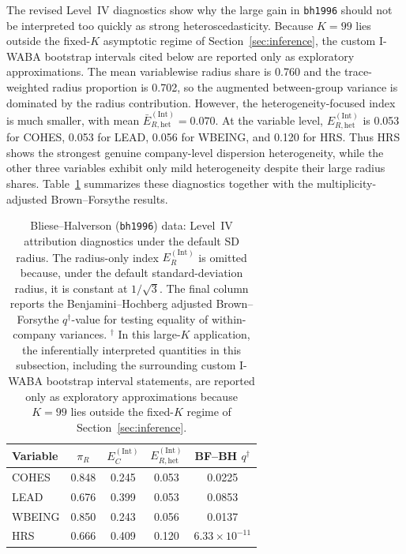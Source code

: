 \documentclass[preprint, times, 12pt, authoryear]{elsarticle}
\begin{document}
The revised Level~IV diagnostics show why the large gain in \texttt{bh1996} should not be interpreted too quickly as strong heteroscedasticity. Because $K=99$ lies outside the fixed-$K$ asymptotic regime of Section~\ref{sec:inference}, the custom I-WABA bootstrap intervals cited below are reported only as exploratory approximations. The mean variablewise radius share is 0.760 and the trace-weighted radius proportion is 0.702, so the augmented between-group variance is dominated by the radius contribution. However, the heterogeneity-focused index is much smaller, with mean $\bar E_{R,\mathrm{het}}^{(\mathrm{Int})}=0.070$. At the variable level, $E_{R,\mathrm{het}}^{(\mathrm{Int})}$ is 0.053 for COHES, 0.053 for LEAD, 0.056 for WBEING, and 0.120 for HRS. Thus HRS shows the strongest genuine company-level dispersion heterogeneity, while the other three variables exhibit only mild heterogeneity despite their large radius shares. Table~\ref{tab:bh1996_level4} summarizes these diagnostics together with the multiplicity-adjusted Brown--Forsythe results.

\begin{table}[ht]
	\centering
	\caption{Bliese--Halverson (\texttt{bh1996}) data: Level~IV attribution diagnostics under the default SD radius. The radius-only index $E_R^{(\mathrm{Int})}$ is omitted because, under the default standard-deviation radius, it is constant at $1/\sqrt{3}$. The final column reports the Benjamini--Hochberg adjusted Brown--Forsythe $q^\dagger$-value for testing equality of within-company variances. \(^\dagger\) In this large-$K$ application, the inferentially interpreted quantities in this subsection, including the surrounding custom I-WABA bootstrap interval statements, are reported only as exploratory approximations because $K=99$ lies outside the fixed-$K$ regime of Section~\ref{sec:inference}.}
	\label{tab:bh1996_level4}
	\begin{tabular}{lcccc}
		\toprule
		Variable & $\pi_R$ & $E_C^{(\mathrm{Int})}$ & $E_{R,\mathrm{het}}^{(\mathrm{Int})}$ & BF--BH $q^\dagger$ \\
		\midrule
		COHES  & 0.848 & 0.245 & 0.053 & 0.0225 \\
		LEAD   & 0.676 & 0.399 & 0.053 & 0.0853 \\
		WBEING & 0.850 & 0.243 & 0.056 & 0.0137 \\
		HRS    & 0.666 & 0.409 & 0.120 & $6.33\times 10^{-11}$ \\
		\bottomrule
	\end{tabular}
\end{table}
\end{document}
